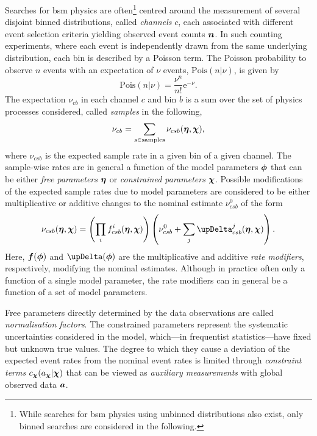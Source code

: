 Searches for \gls{bsm} physics are often\footnote{While searches for \gls{bsm} physics using unbinned distributions also exist, only binned searches are considered in the following.} centred around the measurement of several disjoint binned distributions, called \textit{channels} $c$, each associated with different event selection criteria yielding observed event counts $\makemebold{n}$.
In such counting experiments, where each event is independently drawn from the same underlying distribution, each bin is described by a Poisson term.
The Poisson probability to observe $n$ events with an expectation of $\nu$ events, $\mathrm{Pois}(n\vert\nu)$, is given by
\begin{equation}
	\mathrm{Pois}(n\vert\nu) = \frac{\nu^n}{n!}\mathrm{e}^{-\nu}.
\end{equation}
The expectation $\nu_{cb}$ in each channel $c$ and bin $b$ is a sum over the set of physics processes considered, called \textit{samples} in the following, 
\begin{equation}
	\nu_{cb} = \sum_{s\in\mathrm{samples}}\nu_{csb}(\makemebold{\eta},\makemebold{\chi}),
\end{equation}
where $\nu_{csb}$ is the expected sample rate in a given bin of a given channel. The sample-wise rates are in general a function of the model parameters $\makemebold{\phi}$ that can be either \textit{free parameters} $\makemebold{\eta}$ or \textit{constrained parameters} $\makemebold{\chi}$. Possible modifications of the expected sample rates due to model parameters are considered to be either multiplicative or additive changes to the nominal estimate $\nu_{csb}^0$ of the form
\begin{equation}
	\nu_{csb}(\makemebold{\eta},\makemebold{\chi}) = \left(\prod_i f^i_{csb}(\makemebold{\eta},\makemebold{\chi}) \right)\left(\nu^0_{csb} + \sum_j {\upDelta^j_{csb}(\makemebold{\eta},\makemebold{\chi})} \right).
\end{equation}
Here, $\makemebold{f}(\makemebold{\phi})$ and $\makemebold{\upDelta}(\makemebold{\phi})$ are the multiplicative and additive \textit{rate modifiers}, respectively, modifying the nominal estimates. Although in practice often only a function of a single model parameter, the rate modifiers can in general be a function of a set of model parameters.

Free parameters directly determined by the data observations are called \textit{normalisation factors}.
The constrained parameters represent the systematic uncertainties considered in the model, which---in frequentist statistics---have fixed but unknown true values.
The degree to which they cause a deviation of the expected event rates from the nominal event rates is limited through \textit{constraint terms} $c_{\makemebold{\chi}}(a_{\makemebold{\chi}}\vert\makemebold{\chi})$ that can be viewed as \textit{auxiliary measurements} with global observed data $\makemebold{a}$. 

